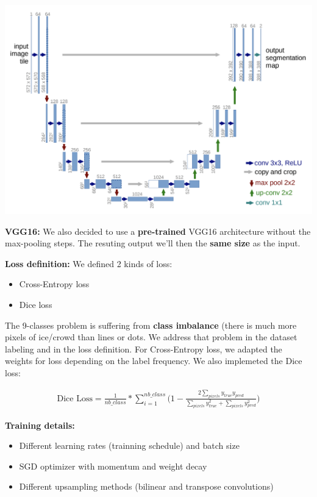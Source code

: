 \documentclass[25pt, a0paper,
               colspace=15mm, subcolspace=0mm,
               blockverticalspace=17mm]{tikzposter} %
\begin{document}
\begin{columns}
{\begin{multicols}{2}
  		\vspace{10mm}
  		{\centering \includegraphics[width=1.0\linewidth]{figures/unet-architecture.png}}
  		
  		\textbf{VGG16:} We also decided to use a \textbf{pre-trained} VGG16 architecture without the max-pooling steps. The resuting output we'll then the \textbf{same size} as the input.
  		  		
  		\columnbreak
  		
  		\textbf{Loss definition:} We defined 2 kinds of loss:
  		\begin{itemize}
  			\item Cross-Entropy loss
  			\item Dice loss
  		\end{itemize}
  	
		The 9-classes problem is suffering from \textbf{class imbalance} (there is much more pixels of ice/crowd than lines or dots. We address that problem in the dataset labeling and in the loss definition. For Cross-Entropy loss, we adapted the weights for loss depending on the label frequency. We also implemeted the Dice loss:
		
		  \vspace{-15mm}
		\begin{gather*}
			\text{Dice Loss} = \frac{1}{nb\_class}*\sum\limits_{i=1}^{nb\_class}\Big(1-\frac{2\sum\limits_{pixels}y_{true}y_{pred}}{\sum\limits_{pixels}y_{true}^{2}+\sum\limits_{pixels}y_{pred}^{2}}\Big)
		\end{gather*}
  		
  		\textbf{Training details:}
  		
  		\vspace{-10mm}
  		\begin{itemize}
  			\item Different learning rates (trainning schedule) and batch size
  			\item SGD optimizer with momentum and weight decay
  			\item Different upsampling methods (bilinear and transpose convolutions)
  		\end{itemize}
  		

\end{multicols}}
\end{columns}
\end{document}

